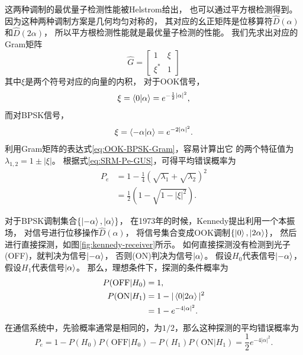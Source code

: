这两种调制的最优量子检测性能被Helstrom给出\cite{helstrom1976quantum}，
也可以通过平方根检测得到。因为这种两种调制方案是几何均匀对称的，
其对应的幺正矩阵是位移算符$\hat{D}(\alpha)$和$\hat{D}(2\alpha)$，
所以平方根检测性能就是最优量子检测的性能。
我们先求出对应的Gram矩阵
\begin{equation}
\hat{G} = \begin{bmatrix}
            1  &   \xi  \\
            \xi^*  &  1
          \end{bmatrix}
\label{eq:OOK-BPSK-Gram}
\end{equation}
其中$\xi$是两个符号对应的向量的内积，
对于OOK信号，
\begin{equation}
\xi = \bra{0}\ket{\alpha} = e^{-\frac{1}{2}|\alpha|^2},
\end{equation}
而对BPSK信号，
\begin{equation}
\xi = \bra{-\alpha}\ket{\alpha} = e^{-2|\alpha|^2}.
\end{equation}
利用Gram矩阵的表达式\ref{eq:OOK-BPSK-Gram}，容易计算出它
的两个特征值为$\lambda_{1,2} = 1 \pm |\xi|$。
根据式\ref{eq:SRM-Pe-GUS}，可得平均错误概率为
\begin{equation}
\begin{split}
P_e  &= 1 - \frac{1}{4}(\sqrt{\lambda_1} + \sqrt{\lambda_2})^2\\
     & = \frac{1}{2} (1 - \sqrt{1 - |\xi|^2}).
\label{eq:OOK-BPSK-Pe-Hel}
\end{split}
\end{equation}

对于BPSK调制集合$\{\ket{-\alpha}, \ket{\alpha} \}$，
在1973年的时候，Kennedy提出\cite{kennedy1973near}利用一个本振场，
对信号进行位移操作$\hat{D}(\alpha)$，
将信号集合变成OOK调制$\{\ket{0}, \ket{2\alpha} \}$，
然后进行直接探测，如图\ref{fig:kennedy-receiver}所示。
如何直接探测没有检测到光子(OFF)，就判决为信号$\ket{-\alpha}$，
否则(ON)判决为信号$\ket{\alpha}$。
假设$H_0$代表信号$\ket{-\alpha}$，假设$H_1$代表信号$\ket{\alpha}$。
那么，理想条件下，探测的条件概率为
\begin{equation}
\begin{split}
P(\text{OFF}|H_0) & = 1, \\
P(\text{ON}|H_1)  & = 1 - |\bra{0}\ket{2\alpha}|^2 \\
                  & = 1 - e^{-4|\alpha|^2}.
\end{split}
\end{equation}
在通信系统中，先验概率通常是相同的，为$1/2$，那么这种探测的平均错误概率为
\begin{equation}
P_e  = 1 - P(H_0)P(\text{OFF}|H_0) - P(H_1)P(\text{ON}|H_1) = \frac{1}{2}e^{-4|\alpha|^2}.
\label{eq:BPSK-Kennedy}
\end{equation}



